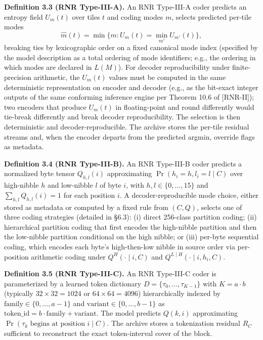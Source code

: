 \documentclass[
]{article}
\begin{document}
\textbf{Definition 3.3 (RNR Type-III-A).} An RNR Type-III-A coder
predicts an entropy field $U_m(t)$ over tiles $t$ and coding modes
$m$, selects predicted per-tile modes
\[
\hat{m}(t) = \min \{ m : U_m(t) = \min_{m'} U_{m'}(t) \},
\]
breaking ties by lexicographic order on a fixed canonical mode
index (specified by the model description as a total ordering of
mode identifiers; e.g., the ordering in which modes are declared in
$L(M)$). For decoder reproducibility under finite-precision
arithmetic, the $U_m(t)$ values must be computed in the same
deterministic representation on encoder and decoder (e.g., as the
bit-exact integer outputs of the same conforming inference engine
per Theorem 10.6 of [RNR-II]); two encoders that produce $U_m(t)$ in
floating-point and round differently would tie-break differently
and break decoder reproducibility. The selection is then
deterministic and decoder-reproducible. The archive stores the
per-tile residual streams and, when the encoder departs from the
predicted argmin, override flags as metadata.

\textbf{Definition 3.4 (RNR Type-III-B).} An RNR Type-III-B coder
predicts a normalized byte tensor $Q_{h, l}(i)$ approximating
$\Pr(h_i = h, l_i = l \mid C)$ over high-nibble $h$ and low-nibble $l$
of byte $i$, with $h, l \in \{0, \ldots, 15\}$ and
$\sum_{h, l} Q_{h, l}(i) = 1$ for each position $i$. A
decoder-reproducible mode choice, either stored as metadata or
computed by a fixed rule from $(C, Q)$, selects one of three coding
strategies (detailed in §6.3): (i) direct 256-class partition
coding; (ii) hierarchical partition coding that first encodes the
high-nibble partition and then the low-nibble partition conditional
on the high nibble; or (iii) per-byte sequential coding, which
encodes each byte's high-then-low nibble in source order via
per-position arithmetic coding under $Q^H(\cdot \mid i, C)$ and
$Q^{L \mid H}(\cdot \mid i, h_i, C)$.

\textbf{Definition 3.5 (RNR Type-III-C).} An RNR Type-III-C coder is
parameterized by a learned token dictionary
$D = \{\tau_0, \ldots, \tau_{K-1}\}$ with $K = a \cdot b$ (typically
$32 \times 32 = 1024$ or $64 \times 64 = 4096$) hierarchically indexed
by $\text{family} \in \{0, \ldots, a-1\}$ and
$\text{variant} \in \{0, \ldots, b-1\}$ as
$\text{token\_id} = b \cdot \text{family} + \text{variant}$. The
model predicts $Q(k, i)$ approximating
$\Pr(\tau_k \text{ begins at position } i \mid C)$.
The archive stores a tokenization residual $R_C$ sufficient to
reconstruct the exact token-interval cover of the block.
\end{document}
